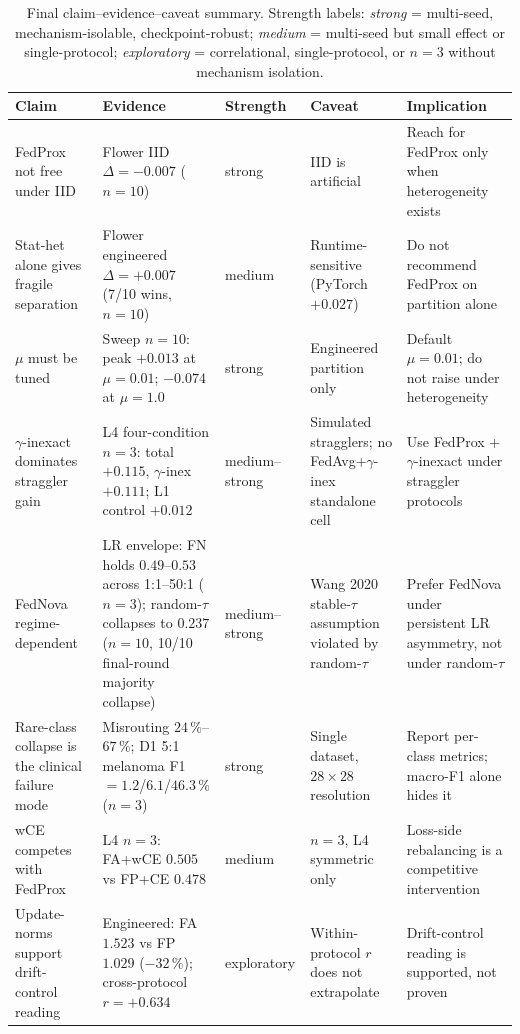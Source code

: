 \documentclass[11pt,a4paper]{report}
\begin{document}
\begin{table}[H]
\centering
\small
\caption[Final claim--evidence--caveat summary]{Final claim--evidence--caveat summary. Strength labels: \emph{strong}
= multi-seed, mechanism-isolable, checkpoint-robust; \emph{medium} =
multi-seed but small effect or single-protocol; \emph{exploratory} =
correlational, single-protocol, or $n=3$ without mechanism isolation.}
\label{tab:final-claims}
\begin{tabular}{p{3.0cm}p{3.6cm}p{1.6cm}p{2.6cm}p{2.6cm}}
\hline
Claim & Evidence & Strength & Caveat & Implication \\
\hline
FedProx not free under IID & Flower IID $\Delta = -0.007$ ($n=10$) & strong & IID is artificial & Reach for FedProx only when heterogeneity exists \\
Stat-het alone gives fragile separation & Flower engineered $\Delta = +0.007$ (7/10 wins, $n=10$) & medium & Runtime-sensitive (PyTorch $+0.027$) & Do not recommend FedProx on partition alone \\
$\mu$ must be tuned & Sweep $n=10$: peak $+0.013$ at $\mu = 0.01$; $-0.074$ at $\mu = 1.0$ & strong & Engineered partition only & Default $\mu = 0.01$; do not raise under heterogeneity \\
$\gamma$-inexact dominates straggler gain & L4 four-condition $n=3$: total $+0.115$, $\gamma$-inex $+0.111$; L1 control $+0.012$ & medium--strong & Simulated stragglers; no FedAvg+$\gamma$-inex standalone cell & Use FedProx + $\gamma$-inexact under straggler protocols \\
FedNova regime-dependent & LR envelope: FN holds $0.49$--$0.53$ across 1:1--50:1 ($n=3$); random-$\tau$ collapses to $0.237$ ($n=10$, 10/10 final-round majority collapse) & medium--strong & Wang 2020 stable-$\tau$ assumption violated by random-$\tau$ & Prefer FedNova under persistent LR asymmetry, not under random-$\tau$ \\
Rare-class collapse is the clinical failure mode & Misrouting $24\,\%$--$67\,\%$; D1 5:1 melanoma F1 $= 1.2$/$6.1$/$46.3\,\%$ ($n=3$) & strong & Single dataset, $28 \times 28$ resolution & Report per-class metrics; macro-F1 alone hides it \\
wCE competes with FedProx & L4 $n=3$: FA+wCE $0.505$ vs FP+CE $0.478$ & medium & $n=3$, L4 symmetric only & Loss-side rebalancing is a competitive intervention \\
Update-norms support drift-control reading & Engineered: FA $1.523$ vs FP $1.029$ ($-32\,\%$); cross-protocol $r = +0.634$ & exploratory & Within-protocol $r$ does not extrapolate & Drift-control reading is supported, not proven \\
\hline
\end{tabular}
\end{table}
\end{document}
